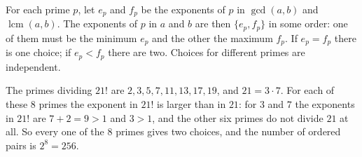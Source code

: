 For each prime $p$, let $e_p$ and $f_p$ be the exponents of $p$ in $\gcd(a,b)$ and $\operatorname{lcm}(a,b)$. The exponents of $p$ in $a$ and $b$ are then $\{e_p,f_p\}$ in some order: one of them must be the minimum $e_p$ and the other the maximum $f_p$. If $e_p=f_p$ there is one choice; if $e_p<f_p$ there are two. Choices for different primes are independent.

The primes dividing $21!$ are $2,3,5,7,11,13,17,19$, and $21=3\cdot7$. For each of these $8$ primes the exponent in $21!$ is larger than in $21$: for $3$ and $7$ the exponents in $21!$ are $7+2=9>1$ and $3>1$, and the other six primes do not divide $21$ at all. So every one of the $8$ primes gives two choices, and the number of ordered pairs is $2^8=\boxed{256}$.
